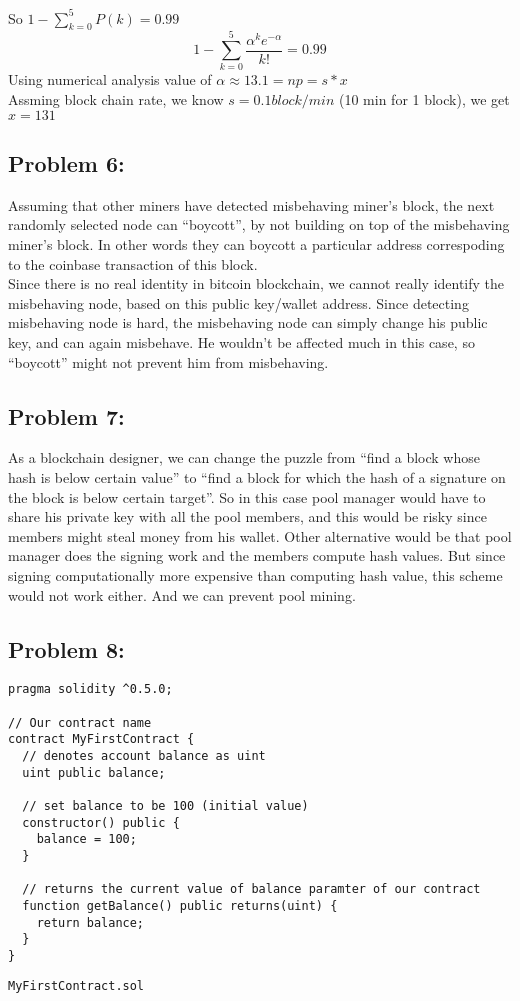 \documentclass[a4paper]{article}
\begin{document}
So $1 - \sum_{k=0}^{5}P(k) = 0.99$ \\
$$1 - \sum_{k=0}^{5} \dfrac{\alpha^k e^{-\alpha}}{k!} = 0.99$$
Using numerical analysis value of $\alpha \approx 13.1 = np = s*x$ \\
Assming block chain rate, we know $s = 0.1 block/min$ (10 min for 1 block), we get $x = 131$

\subsection*{Problem 6:}
Assuming that other miners have detected misbehaving miner's block, the next randomly selected node can
``boycott'', by not building on top of the misbehaving miner's block. In other words they can boycott
a particular address correspoding to the coinbase transaction of this block. \\

Since there is no real identity in
bitcoin blockchain, we cannot really identify the misbehaving node, based on this public key/wallet address.
Since detecting misbehaving node is hard, the misbehaving node can simply change his public key, and
can again misbehave. He wouldn't be affected much in this case, so ``boycott'' might not prevent him from misbehaving.

\subsection*{Problem 7:}
As a blockchain designer, we can change the puzzle from ``find a block whose hash is below certain value'' to
``find a block for which the hash of a signature on the block is below certain target''. So in this case
pool manager would have to share his private key with all the pool members, and this would be risky
since members might steal money from his wallet. Other alternative would be that pool manager does the signing work
and the members compute hash values. But since signing computationally more expensive than computing hash value,
this scheme would not work either. And we can prevent pool mining.

\subsection*{Problem 8:}
\begin{lstlisting}[style=C++]
pragma solidity ^0.5.0;

// Our contract name
contract MyFirstContract {
  // denotes account balance as uint
  uint public balance;
  
  // set balance to be 100 (initial value)     
  constructor() public {
    balance = 100;
  }

  // returns the current value of balance paramter of our contract
  function getBalance() public returns(uint) {
    return balance;
  }
}
\end{lstlisting}
\texttt{MyFirstContract.sol} \\
\end{document}
